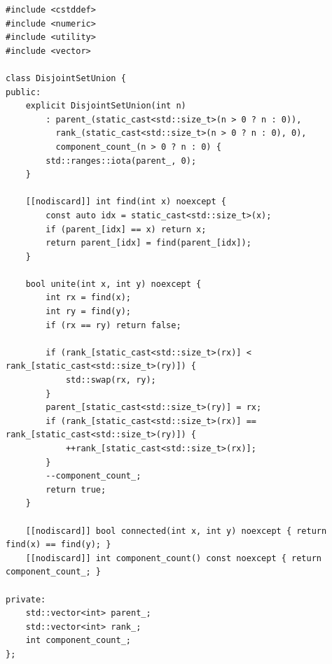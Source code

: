 \documentclass[11pt,a4paper]{article}
\theoremstyle{definition}
\begin{document}
\begin{lstlisting}[caption={Disjoint Set Union with path compression and union by rank}]
#include <cstddef>
#include <numeric>
#include <utility>
#include <vector>

class DisjointSetUnion {
public:
    explicit DisjointSetUnion(int n)
        : parent_(static_cast<std::size_t>(n > 0 ? n : 0)),
          rank_(static_cast<std::size_t>(n > 0 ? n : 0), 0),
          component_count_(n > 0 ? n : 0) {
        std::ranges::iota(parent_, 0);
    }

    [[nodiscard]] int find(int x) noexcept {
        const auto idx = static_cast<std::size_t>(x);
        if (parent_[idx] == x) return x;
        return parent_[idx] = find(parent_[idx]);
    }

    bool unite(int x, int y) noexcept {
        int rx = find(x);
        int ry = find(y);
        if (rx == ry) return false;

        if (rank_[static_cast<std::size_t>(rx)] < rank_[static_cast<std::size_t>(ry)]) {
            std::swap(rx, ry);
        }
        parent_[static_cast<std::size_t>(ry)] = rx;
        if (rank_[static_cast<std::size_t>(rx)] == rank_[static_cast<std::size_t>(ry)]) {
            ++rank_[static_cast<std::size_t>(rx)];
        }
        --component_count_;
        return true;
    }

    [[nodiscard]] bool connected(int x, int y) noexcept { return find(x) == find(y); }
    [[nodiscard]] int component_count() const noexcept { return component_count_; }

private:
    std::vector<int> parent_;
    std::vector<int> rank_;
    int component_count_;
};
\end{lstlisting}
\end{document}
